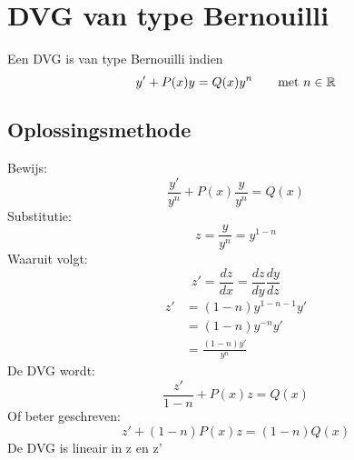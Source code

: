 
\section{DVG van type Bernouilli}
Een DVG is van type Bernouilli indien
$$y' + P(x)y = Q(x)y^n \qquad \hbox{met } n \in \mathbb{R}$$
\subsection{Oplossingsmethode}
Bewijs:
$$\frac{y'}{y^n} + P(x)\frac{y}{y^n} = Q(x)$$
Substitutie: $$z = \frac{y}{y^n} = y^{1 - n}$$
Waaruit volgt: $$z' = \frac{dz}{dx} = \frac{dz}{dy}\frac{dy}{dz}$$
\begin{equation*}
 \begin{split}
  z' & = (1 - n)y^{1 - n - 1}y' \\
     & = (1 - n)y^{-n}y' \\
     & = \frac{(1 - n)y'}{y^n}
 \end{split}
\end{equation*}
De DVG wordt:
$$\frac{z'}{1 - n} + P(x)z = Q(x)$$
Of beter geschreven:
$$z' + (1 -n)P(x)z = (1 - n)Q(x)$$
De DVG is lineair in z en z'

